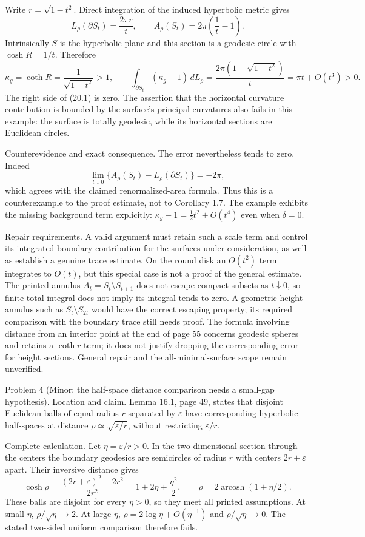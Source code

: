 \documentclass[10pt]{article}
\begin{document}
Write \(r=\sqrt{1-t^2}\). Direct integration of the induced hyperbolic metric gives \[L_\rho(\partial S_t)=\frac{2\pi r}{t},\qquad
 A_\rho(S_t)=2\pi\left(\frac1t-1\right).\] Intrinsically \(S\) is the hyperbolic plane and this section is a geodesic circle with \(\cosh R=1/t\). Therefore \[\kappa_g=\coth R=\frac1{\sqrt{1-t^2}}>1,\qquad
 \int_{\partial S_t}(\kappa_g-1)\,dL_\rho
   =\frac{2\pi(1-\sqrt{1-t^2})}{t}
   =\pi t+O(t^3)>0.\] The right side of (20.1) is zero. The assertion that the horizontal curvature contribution is bounded by the surface’s principal curvatures also fails in this example: the surface is totally geodesic, while its horizontal sections are Euclidean circles.\par
Counterevidence and exact consequence. The error nevertheless tends to zero. Indeed \[\lim_{t\downarrow0}\{A_\rho(S_t)-L_\rho(\partial S_t)\}=-2\pi,\] which agrees with the claimed renormalized-area formula. Thus this is a counterexample to the proof estimate, not to Corollary 1.7. The example exhibits the missing background term explicitly: \(\kappa_g-1=\tfrac12t^2+O(t^4)\) even when \(\delta=0\).\par
Repair requirements. A valid argument must retain such a scale term and control its integrated boundary contribution for the surfaces under consideration, as well as establish a genuine trace estimate. On the round disk an \(O(t^2)\) term integrates to \(O(t)\), but this special case is not a proof of the general estimate. The printed annulus \(A_t=S_t\setminus S_{t+1}\) does not escape compact subsets as \(t\downarrow0\), so finite total integral does not imply its integral tends to zero. A geometric-height annulus such as \(S_t\setminus S_{2t}\) would have the correct escaping property; its required comparison with the boundary trace still needs proof. The formula involving distance from an interior point at the end of page 55 concerns geodesic spheres and retains a \(\coth r\) term; it does not justify dropping the corresponding error for height sections. General repair and the all-minimal-surface scope remain unverified.\par
Problem 4 (Minor: the half-space distance comparison needs a small-gap hypothesis).  Location and claim. Lemma 16.1, page 49, states that disjoint Euclidean balls of equal radius \(r\) separated by \(\varepsilon\) have corresponding hyperbolic half-spaces at distance \(\rho\simeq\sqrt{\varepsilon/r}\), without restricting \(\varepsilon/r\).\par
Complete calculation. Let \(\eta=\varepsilon/r>0\). In the two-dimensional section through the centers the boundary geodesics are semicircles of radius \(r\) with centers \(2r+\varepsilon\) apart. Their inversive distance gives \[\cosh\rho=\frac{(2r+\varepsilon)^2-2r^2}{2r^2}
          =1+2\eta+\frac{\eta^2}{2},
 \qquad
 \rho=2\operatorname{arcosh}(1+\eta/2).\] These balls are disjoint for every \(\eta>0\), so they meet all printed assumptions. At small \(\eta\), \(\rho/\sqrt\eta\to2\). At large \(\eta\), \(\rho=2\log\eta+O(\eta^{-1})\) and \(\rho/\sqrt\eta\to0\). The stated two-sided uniform comparison therefore fails.\par
\end{document}
